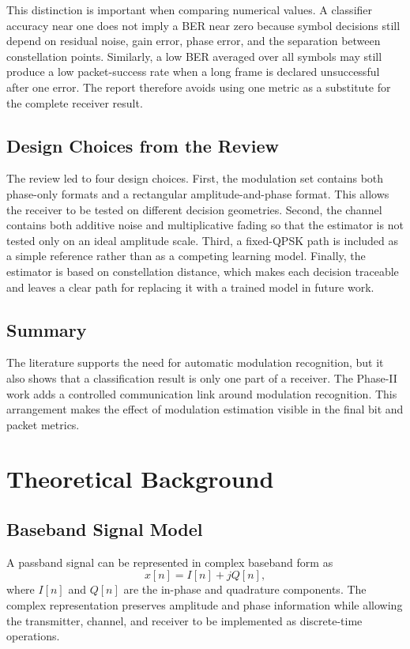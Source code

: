 \documentclass[12pt,twoside,openright]{report}
\begin{document}
This distinction is important when comparing numerical values. A classifier
accuracy near one does not imply a BER near zero because symbol decisions
still depend on residual noise, gain error, phase error, and the separation
between constellation points. Similarly, a low BER averaged over all
symbols may still produce a low packet-success rate when a long frame is
declared unsuccessful after one error. The report therefore avoids using one
metric as a substitute for the complete receiver result.

\section{Design Choices from the Review}
The review led to four design choices. First, the modulation set contains
both phase-only formats and a rectangular amplitude-and-phase format. This
allows the receiver to be tested on different decision geometries. Second,
the channel contains both additive noise and multiplicative fading so that
the estimator is not tested only on an ideal amplitude scale. Third, a
fixed-QPSK path is included as a simple reference rather than as a competing
learning model. Finally, the estimator is based on constellation distance,
which makes each decision traceable and leaves a clear path for replacing it
with a trained model in future work.

\section{Summary}
The literature supports the need for automatic modulation recognition, but
it also shows that a classification result is only one part of a receiver.
The Phase-II work adds a controlled communication link around modulation
recognition. This arrangement makes the effect of modulation estimation
visible in the final bit and packet metrics.

\chapter{Theoretical Background}

\section{Baseband Signal Model}
A passband signal can be represented in complex baseband form as
\begin{equation}
x[n]=I[n]+jQ[n],
\end{equation}
where $I[n]$ and $Q[n]$ are the in-phase and quadrature components. The
complex representation preserves amplitude and phase information while
allowing the transmitter, channel, and receiver to be implemented as
discrete-time operations.
\end{document}
